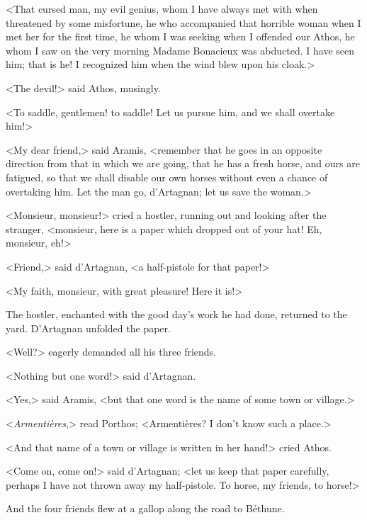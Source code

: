 <That cursed man, my evil genius, whom I have always met with when threatened by some misfortune, he who accompanied that horrible woman when I met her for the first time, he whom I was seeking when I offended our Athos, he whom I saw on the very morning Madame Bonacieux was abducted. I have seen him; that is he! I recognized him when the wind blew upon his cloak.> 

<The devil!> said Athos, musingly. 

<To saddle, gentlemen! to saddle! Let us pursue him, and we shall overtake him!> 

<My dear friend,> said Aramis, <remember that he goes in an opposite direction from that in which we are going, that he has a fresh horse, and ours are fatigued, so that we shall disable our own horses without even a chance of overtaking him. Let the man go, d'Artagnan; let us save the woman.> 

<Monsieur, monsieur!> cried a hostler, running out and looking after the stranger, <monsieur, here is a paper which dropped out of your hat! Eh, monsieur, eh!> 

<Friend,> said d'Artagnan, <a half-pistole for that paper!> 

<My faith, monsieur, with great pleasure! Here it is!> 

The hostler, enchanted with the good day's work he had done, returned to the yard. D'Artagnan unfolded the paper. 

<Well?> eagerly demanded all his three friends. 

<Nothing but one word!> said d'Artagnan. 

<Yes,> said Aramis, <but that one word is the name of some town or village.> 

<\textit{Armentières},> read Porthos; <Armentières? I don't know such a place.> 

<And that name of a town or village is written in her hand!> cried Athos. 

<Come on, come on!> said d'Artagnan; <let us keep that paper carefully, perhaps I have not thrown away my half-pistole. To horse, my friends, to horse!> 

And the four friends flew at a gallop along the road to Béthune.